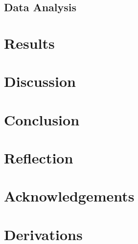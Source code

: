 \documentclass[aps,pra,english,notitlepage,reprint,nofootinbib]{revtex4-1}  %
\begin{document}
\subsection{Data Analysis}\label{subsec:data}




\section{Results}\label{sec:results}


\section{Discussion}\label{sec:discussion}


\section{Conclusion}\label{sec:conclusion}


\section{Reflection}\label{sec:reflection}

\section*{Acknowledgements}\label{sec:cknowledgements}



\newpage
\appendix
\onecolumngrid
\section{Derivations}\label{appsec:derivations}
\end{document}
